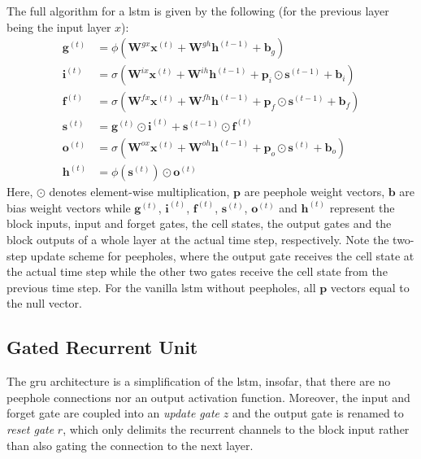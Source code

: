 The full algorithm for a \gls{lstm} is given by the following (for the previous layer being the input layer $x$):
\begin{align}
	\bm{g}^{(t)} &= \phi\left(\bm{W}^{gx}\bm{x}^{(t)} + \bm{W}^{gh}\bm{h}^{(t-1)} + \bm{b}_g\right) \\
	\bm i^{(t)} &= \sigma\left(\bm W^{ix}\bm x^{(t)} + \bm W^{ih}\bm h^{(t-1)} + \bm p_i\odot \bm s^{(t-1)} + \bm b_i \right)\\
	\bm f^{(t)} &= \sigma\left(\bm W^{fx}\bm x^{(t)} + \bm W^{fh}\bm h^{(t-1)} +\bm p_f\odot \bm s^{(t-1)} + \bm b_f\right)\\
	\bm s^{(t)} &= \bm g^{(t)}\odot \bm i^{(t)} + \bm s^{(t-1)}\odot \bm f^{(t)}\\
	\bm o^{(t)} &= \sigma\left(\bm W^{ox}\bm x^{(t)} + \bm W^{oh}\bm h^{(t-1)} +\bm p_o\odot \bm s^{(t)} + \bm b_o\right)\\
	\bm h^{(t)} &= \phi(\bm s^{(t)})\odot \bm o^{(t)}
\end{align}
Here, $\odot$ denotes element-wise multiplication, $\bm p$ are peephole weight vectors, $\bm b$ are bias weight vectors while $\bm{g}^{(t)}$, $\bm i^{(t)}$, $\bm f^{(t)}$, $\bm s^{(t)}$, $\bm o^{(t)}$ and $\bm h^{(t)}$ represent the block inputs, input and forget gates, the cell states, the output gates and the block outputs of a whole layer at the actual time step, respectively.
Note the two-step update scheme for peepholes, where the output gate receives the cell state at the actual time step while the other two gates receive the cell state from the previous time step.
For the vanilla \gls{lstm} without peepholes, all $\bm p$ vectors equal to the null vector.

\subsection{Gated Recurrent Unit}
The \gls{gru} architecture is a simplification of the \gls{lstm}, insofar, that there are no peephole connections nor an output activation function.
Moreover, the input and forget gate are coupled into an \textit{update gate} $z$ and the output gate is renamed to \textit{reset gate} $r$, which only delimits the recurrent channels to the block input rather than also gating the connection to the next layer.

